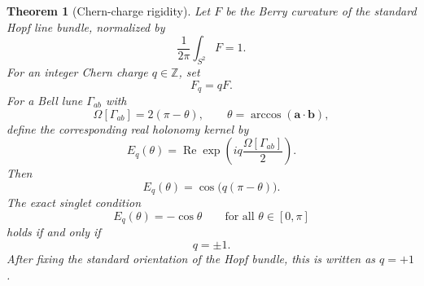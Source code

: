 \documentclass[
  aps,
  pra,
  reprint,
  superscriptaddress,
  nofootinbib,
  longbibliography,
  floatfix,
  amsmath,
  amssymb
]{revtex4-2}
\theoremstyle{plain}
\newtheorem{theorem}{Theorem}
\theoremstyle{definition}
\theoremstyle{remark}
\begin{document}
\begin{theorem}[Chern-charge rigidity]
\label{thm:chernrigidity}
Let \(F\) be the Berry curvature of the standard Hopf line bundle, normalized by
\begin{equation}
\frac{1}{2\pi}\int_{S^2}F=1.
\end{equation}
For an integer Chern charge \(q\in\mathbb Z\), set
\begin{equation}
F_q=qF.
\end{equation}
For a Bell lune \(\Gamma_{ab}\) with
\begin{equation}
\Omega[\Gamma_{ab}]=2(\pi-\theta),
\qquad
\theta=\arccos(\bm a\cdot\bm b),
\end{equation}
define the corresponding real holonomy kernel by
\begin{equation}
E_q(\theta)=\operatorname{Re}\exp\left(iq\frac{\Omega[\Gamma_{ab}]}{2}\right).
\end{equation}
Then
\begin{equation}
E_q(\theta)=\cos\bigl(q(\pi-\theta)\bigr).
\end{equation}
The exact singlet condition
\begin{equation}
E_q(\theta)=-\cos\theta
\qquad
\text{for all }\theta\in[0,\pi]
\end{equation}
holds if and only if
\begin{equation}
q=\pm1.
\end{equation}
After fixing the standard orientation of the Hopf bundle, this is written as \(q=+1\).
\end{theorem}
\end{document}

